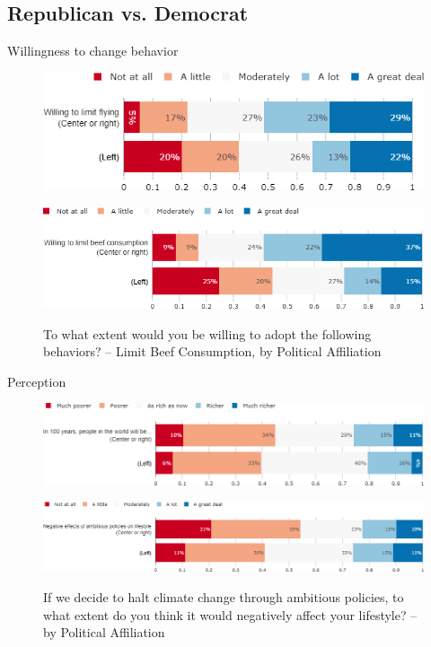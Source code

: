 \documentclass[aspectratio=169,9pt,dvipsnames]{beamer}
\begin{document}
\subsection{Republican vs. Democrat}
\begin{frame}{Willingness to change behavior}%
\vspace{-.2cm}
\begin{figure}[h!]
\caption{To what extent would you be willing to adopt the following behaviors? -– Limit Flying, by Political Affiliation}
\includegraphics[width=.6\textwidth]{../figures/US/willing_limit_flying_US_pol.png} \\
\vspace{.5cm}
\caption{To what extent would you be willing to adopt the following behaviors? -- Limit Beef Consumption, by Political Affiliation}
\includegraphics[width=.7\textwidth]{../figures/US/willing_limit_beef_US_pol.png} \\
\end{figure}
\end{frame}

\begin{frame}{Perception}%
\vspace{-.5cm}
\begin{figure}[h!]
\caption{Do you think that overall people in the world will be richer or poorer in 100 years from now? -– by Political Affiliation}
\includegraphics[width=.7\textwidth]{../figures/US/future_richness_US_pol.png} \\
\vspace{.5cm}
\caption{If we decide to halt climate change through ambitious policies, to what extent do you think it would negatively affect your lifestyle? -- by Political Affiliation}
\includegraphics[width=.7\textwidth]{../figures/US/effect_halt_CC_lifestyle_US_pol.png} \\
\end{figure}
\end{frame}
\end{document}
